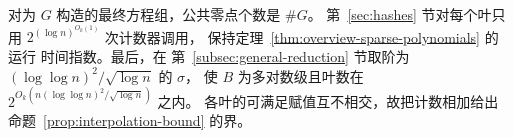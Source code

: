 对为 $G$ 构造的最终方程组，公共零点个数是 $\#G$。
第~\ref{sec:hashes} 节对每个叶只用
$2^{(\log n)^{O_k(1)}}$ 次计数器调用，
保持定理~\ref{thm:overview-sparse-polynomials} 的运行
时间指数。最后，在
第~\ref{subsec:general-reduction} 节取阶为
$(\log\log n)^2/\sqrt{\log n}$ 的 $\sigma$，
使 $B$ 为多对数级且叶数在
$2^{O_k(n(\log\log n)^2/\sqrt{\log n})}$ 之内。
各叶的可满足赋值互不相交，故把计数相加给出
命题~\ref{prop:interpolation-bound} 的界。
